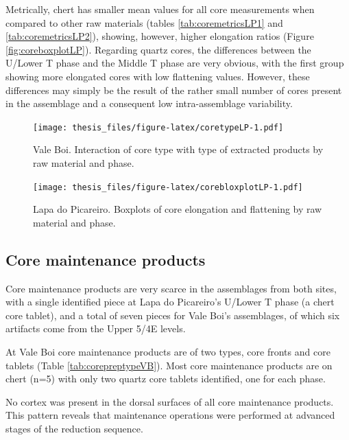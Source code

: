 \documentclass[12pt,twoside]{reedthesis}
\begin{document}
Metrically, chert has smaller mean values for all core measurements when compared to other raw materials (tables \ref{tab:coremetricsLP1} and \ref{tab:coremetricsLP2}), showing, however, higher elongation ratios (Figure \ref{fig:coreboxplotLP}). Regarding quartz cores, the differences between the U/Lower T phase and the Middle T phase are very obvious, with the first group showing more elongated cores with low flattening values. However, these differences may simply be the result of the rather small number of cores present in the assemblage and a consequent low intra-assemblage variability.
\begin{figure}
\centering
\texttt{[image: thesis\_files/figure-latex/coretypeLP-1.pdf]}
\caption{\label{fig:coretypeLP}Vale Boi. Interaction of core type with type of extracted products by raw material and phase.}
\end{figure}
\begin{figure}
\centering
\texttt{[image: thesis\_files/figure-latex/corebloxplotLP-1.pdf]}
\caption{\label{fig:corebloxplotLP}Lapa do Picareiro. Boxplots of core elongation and flattening by raw material and phase.}
\end{figure}
\hypertarget{core-maintenance-products}{%
\subsection{Core maintenance products}\label{core-maintenance-products}}

Core maintenance products are very scarce in the assemblages from both sites, with a single identified piece at Lapa do Picareiro's U/Lower T phase (a chert core tablet), and a total of seven pieces for Vale Boi's assemblages, of which six artifacts come from the Upper 5/4E levels.

At Vale Boi core maintenance products are of two types, core fronts and core tablets (Table \ref{tab:corepreptypeVB}). Most core maintenance products are on chert (n=5) with only two quartz core tablets identified, one for each phase.

No cortex was present in the dorsal surfaces of all core maintenance products. This pattern reveals that maintenance operations were performed at advanced stages of the reduction sequence.
\end{document}
